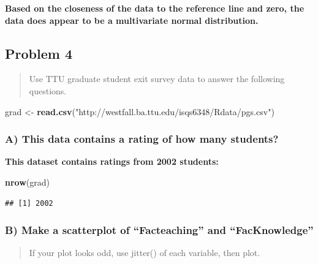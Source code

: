 \documentclass[
]{article}
\newenvironment{Shaded}{\begin{snugshade}}{\end{snugshade}}
\newcommand{\KeywordTok}[1]{\textcolor[rgb]{0.13,0.29,0.53}{\textbf{#1}}}
\newcommand{\NormalTok}[1]{#1}
\newcommand{\StringTok}[1]{\textcolor[rgb]{0.31,0.60,0.02}{#1}}
\begin{document}
\textbf{Based on the closeness of the data to the reference line and
zero, the data does appear to be a multivariate normal distribution.}

\hypertarget{problem-4}{%
\subsection{Problem 4}\label{problem-4}}

\begin{quote}
Use TTU graduate student exit survey data to answer the following
questions.
\end{quote}

\begin{Shaded}
\begin{Highlighting}[]
\NormalTok{grad <-}\StringTok{ }\KeywordTok{read.csv}\NormalTok{(}\StringTok{"http://westfall.ba.ttu.edu/isqs6348/Rdata/pgs.csv"}\NormalTok{)}
\end{Highlighting}
\end{Shaded}

\hypertarget{a-this-data-contains-a-rating-of-how-many-students}{%
\subsubsection{A) This data contains a rating of how many
students?}\label{a-this-data-contains-a-rating-of-how-many-students}}

\textbf{This dataset contains ratings from 2002 students:}

\begin{Shaded}
\begin{Highlighting}[]
\KeywordTok{nrow}\NormalTok{(grad)}
\end{Highlighting}
\end{Shaded}

\begin{verbatim}
## [1] 2002
\end{verbatim}

\hypertarget{b-make-a-scatterplot-of-facteaching-and-facknowledge}{%
\subsubsection{B) Make a scatterplot of ``Facteaching'' and
``FacKnowledge''}\label{b-make-a-scatterplot-of-facteaching-and-facknowledge}}

\begin{quote}
If your plot looks odd, use jitter() of each variable, then plot.
\end{quote}
\end{document}
